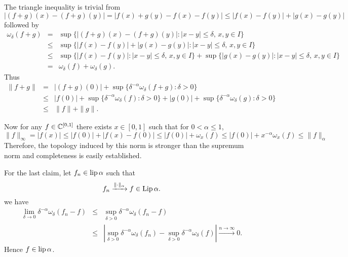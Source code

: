 \begin{enumerate}
The triangle inequality is trivial
from 
\begin{equation*}
|(f+g)(x) - (f+g)(y)| = |f(x) + g(y) - f(x) - f(y)| 
 \leq |f(x) - f(y)| + |g(x) - g(y)|
\end{equation*}
followed by
\begin{eqnarray*}
 \omega_\delta(f+g)
 &=& \sup \{|(f+g)(x) - (f+g)(y)|: |x-y|\leq \delta,\, x,y\in I\} \\
 &\leq& \sup \{|f(x)-f(y)| + |g(x)-g(y)|: |x-y|\leq \delta,\, x,y\in I\}\\
 &\leq&   \sup \{|f(x)-f(y)|: |x-y|\leq \delta,\, x,y\in I\}
        + \sup \{|g(x)-g(y)|: |x-y|\leq \delta,\, x,y\in I\}\\
 &=& \omega_\delta(f) + \omega_\delta(g).
\end{eqnarray*}
Thus
\begin{eqnarray*}
\|f+g\|
&=&    |(f+g)(0)| + \sup\{\delta^{-\alpha} \omega_\delta(f+g): \delta > 0\} \\
&\leq&    |f(0)| + \sup\{\delta^{-\alpha} \omega_\delta(f): \delta > 0\} +
          |g(0)| + \sup\{\delta^{-\alpha} \omega_\delta(g): \delta > 0\} \\
&\leq& \|f\| + \|g\|.
\end{eqnarray*}

Now for any \(f\in \mathbb{C}^{[0,1]}\) there exists \(x\in[0,1]\) such that
for \(0<\alpha \leq 1\),
\begin{equation*}
\|f\|_\infty = |f(x)| \leq 
 |f(0)| + |f(x) - f(0)| \leq |f(0)| + \omega_x(f) \leq 
 |f(0)| + x^{-\alpha} \omega_x(f) \leq \|f\|_\alpha
\end{equation*}
Therefore, the topology induced by this norm is stronger than 
the supremum norm and completeness is easily established.

For the last claim, let \(f_n\in \mathop{\rm lip}\nolimits\alpha\)
such that 
\begin{equation*}
f_n \xrightarrow{\|\cdot\|_\alpha} f \in \mathop{\rm Lip}\nolimits \alpha.
\end{equation*}
we have
\begin{eqnarray*}
\lim_{\delta\rightarrow 0} \delta^{-\alpha} \omega_\delta(f_n - f)
 &\leq& \sup_{\delta > 0} \delta^{-\alpha} \omega_\delta(f_n - f) \\
 &\leq&  \left| \sup_{\delta > 0} \delta^{-\alpha} \omega_\delta(f_n) -
                \sup_{\delta > 0} \delta^{-\alpha} \omega_\delta(f) \right|
       \xrightarrow{n\rightarrow\infty} 0.
\end{eqnarray*}
Hence \(f\in \mathop{\rm lip}\nolimits\alpha\).


\end{enumerate}
